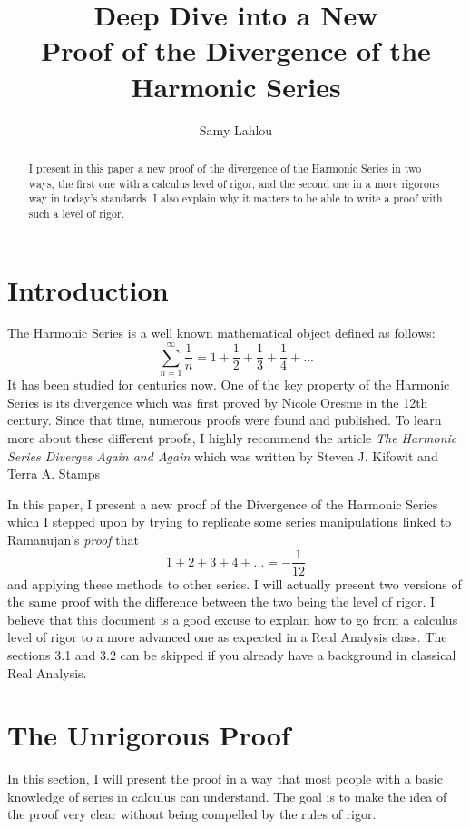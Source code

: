 \documentclass[12pt]{article}
\title{Deep Dive into a New \\ Proof of the Divergence of the Harmonic Series}
\author{Samy Lahlou}
\date{}
\theoremstyle{definition}
\newcounter{prop}[section]
\begin{document}
\maketitle

\begin{abstract}
    I present in this paper a new proof of the divergence of the Harmonic Series in two ways, the first one with a calculus level of rigor, and the second one in a more rigorous way in today's standards. I also explain why it matters to be able to write a proof with such a level of rigor.
\end{abstract}

\tableofcontents

\newpage

\section{Introduction}
The Harmonic Series is a well known mathematical object defined as follows:
$$\sum_{n=1}^{\infty}\frac{1}{n} = 1 + \frac{1}{2} + \frac{1}{3} + \frac{1}{4} + ...$$
It has been studied for centuries now. One of the key property of the Harmonic Series is its divergence which was first proved by Nicole Oresme in the 12th century. Since that time, numerous proofs were found and published. To learn more about these different proofs, I highly recommend the article \textit{The Harmonic Series Diverges Again and Again} which was written by Steven J. Kifowit and Terra A. Stamps \cite{harmonicseries} 

In this paper, I present a new proof of the Divergence of the Harmonic Series which I stepped upon by trying to replicate some series manipulations linked to Ramanujan's \textit{proof} that
$$1 + 2 + 3 + 4 + ... = -\frac{1}{12}$$
and applying these methods to other series. I will actually present two versions of the same proof with the difference between the two being the level of rigor. I believe that this document is a good excuse to explain how to go from a calculus level of rigor to a more advanced one as expected in a Real Analysis class. The sections 3.1 and 3.2 can be skipped if you already have a background in classical Real Analysis.

\section{The Unrigorous Proof}

In this section, I will present the proof in a way that most people with a basic knowledge of series in calculus can understand. The goal is to make the idea of the proof very clear without being compelled by the rules of rigor. 
\end{document}
